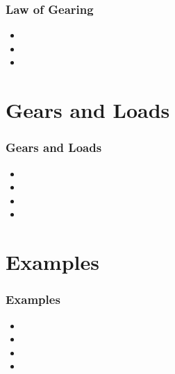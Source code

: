 \documentclass[fleqn]{beamer} %
\newcommand{\sectiontitleII}{Law of Gearing}
\newcommand{\sectiontitleIII}{Gears and Loads}
\newcommand{\sectiontitleIV}{Examples}
\begin{document}
	\begin{frame} \small
		\frametitle{\sectiontitleII}
		
		   	\begin{itemize}
					\item 
					\item
					\item
	        \end{itemize}
            
  	\end{frame}
		

\section{\sectiontitleIII}	

	\begin{frame}[label=sectionIII] \small
		\frametitle{\sectiontitleIII}
	 
	       \begin{itemize}
	            \item 
	            \item 
	            \item 
	            \item 
	        \end{itemize}

		\end{frame}  
	
\section{\sectiontitleIV}	
	    \begin{frame}[label=sectionIV] \small
		\frametitle{\sectiontitleIV}    
  
  			\begin{itemize}
	            \item 
	            \item 
	            \item 
	            \item 
	        \end{itemize}

		\end{frame}
		
\end{document}
